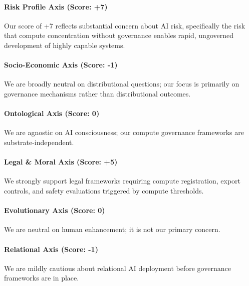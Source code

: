 \paragraph{Risk Profile Axis (Score:
+7)}\label{risk-profile-axis-score-7}

Our score of +7 reflects substantial concern about AI risk, specifically
the risk that compute concentration without governance enables rapid,
ungoverned development of highly capable systems.

\paragraph{Socio-Economic Axis (Score:
-1)}\label{socio-economic-axis-score--1}

We are broadly neutral on distributional questions; our focus is
primarily on governance mechanisms rather than distributional outcomes.

\paragraph{Ontological Axis (Score:
0)}\label{ontological-axis-score-0-3}

We are agnostic on AI consciousness; our compute governance frameworks
are substrate-independent.

\paragraph{Legal \& Moral Axis (Score:
+5)}\label{legal-moral-axis-score-5-3}

We strongly support legal frameworks requiring compute registration,
export controls, and safety evaluations triggered by compute thresholds.

\paragraph{Evolutionary Axis (Score:
0)}\label{evolutionary-axis-score-0-1}

We are neutral on human enhancement; it is not our primary concern.

\paragraph{Relational Axis (Score: -1)}\label{relational-axis-score--1}

We are mildly cautious about relational AI deployment before governance
frameworks are in place.

